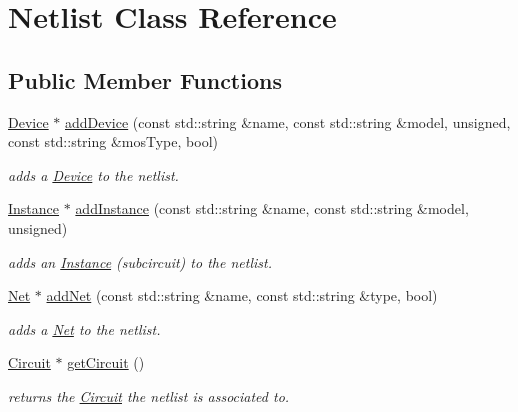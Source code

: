 \hypertarget{class_open_chams_1_1_netlist}{}\section{Netlist Class Reference}
\label{class_open_chams_1_1_netlist}
\subsection*{Public Member Functions}
\begin{DoxyCompactItemize}
\item 
\mbox{\hyperlink{class_open_chams_1_1_device}{Device}} $\ast$ \mbox{\hyperlink{class_open_chams_1_1_netlist_a8e1798a2516c32fbab629ce8d60d4b1d}{add\+Device}} (const std\+::string \&name, const std\+::string \&model, unsigned, const std\+::string \&mos\+Type, bool)
\begin{DoxyCompactList}\small\item\em adds a \mbox{\hyperlink{class_open_chams_1_1_device}{Device}} to the netlist. \end{DoxyCompactList}\item 
\mbox{\hyperlink{class_open_chams_1_1_instance}{Instance}} $\ast$ \mbox{\hyperlink{class_open_chams_1_1_netlist_af0fb73e5e8589a64d13b6d8104a34a03}{add\+Instance}} (const std\+::string \&name, const std\+::string \&model, unsigned)
\begin{DoxyCompactList}\small\item\em adds an \mbox{\hyperlink{class_open_chams_1_1_instance}{Instance}} (subcircuit) to the netlist. \end{DoxyCompactList}\item 
\mbox{\hyperlink{class_open_chams_1_1_net}{Net}} $\ast$ \mbox{\hyperlink{class_open_chams_1_1_netlist_a52be455a704925328843770552eca43d}{add\+Net}} (const std\+::string \&name, const std\+::string \&type, bool)
\begin{DoxyCompactList}\small\item\em adds a \mbox{\hyperlink{class_open_chams_1_1_net}{Net}} to the netlist. \end{DoxyCompactList}\item 
\mbox{\label{class_open_chams_1_1_netlist_a01673b4356977793545c5f3a55ceaba5}} 
\mbox{\hyperlink{class_open_chams_1_1_circuit}{Circuit}} $\ast$ \mbox{\hyperlink{class_open_chams_1_1_netlist_a01673b4356977793545c5f3a55ceaba5}{get\+Circuit}} ()
\begin{DoxyCompactList}\small\item\em returns the \mbox{\hyperlink{class_open_chams_1_1_circuit}{Circuit}} the netlist is associated to. \end{DoxyCompactList}\item 

\end{DoxyCompactItemize}
